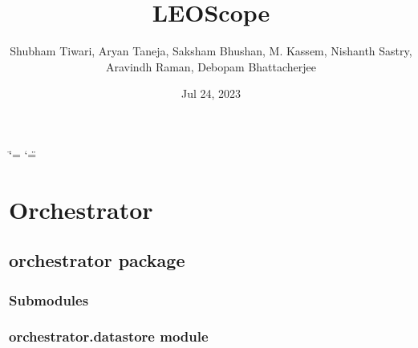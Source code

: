 \documentclass[letterpaper,10pt,english]{sphinxmanual}
\title{LEOScope}
\date{Jul 24, 2023}
\author{Shubham Tiwari, Aryan Taneja, Saksham Bhushan, M.\@{} Kassem, Nishanth Sastry, Aravindh Raman, Debopam Bhattacherjee}
\begin{document}
\ifdefined\shorthandoff
  \ifnum\catcode`\=\string=\active\shorthandoff{=}\fi
  \ifnum\catcode`\"=\active{}\fi
\fi

\pagestyle{empty}
\sphinxmaketitle
\pagestyle{plain}
\sphinxtableofcontents
\pagestyle{normal}
\label{\detokenize{index::doc}}


\sphinxstepscope


\chapter{Orchestrator}
\label{\detokenize{modules:orchestrator}}\label{\detokenize{modules::doc}}
\sphinxstepscope


\section{orchestrator package}
\label{\detokenize{orchestrator:orchestrator-package}}\label{\detokenize{orchestrator::doc}}

\subsection{Submodules}
\label{\detokenize{orchestrator:submodules}}

\subsection{orchestrator.datastore module}
\label{\detokenize{orchestrator:module-orchestrator.datastore}}\label{\detokenize{orchestrator:orchestrator-datastore-module}}
\end{document}

